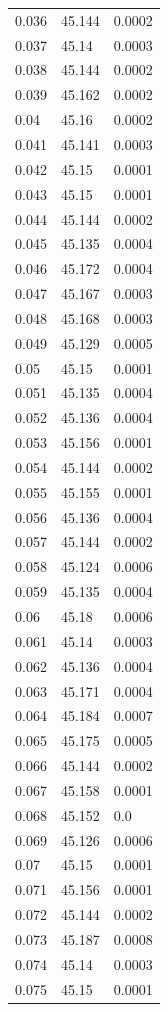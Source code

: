 \begin{table}[H]
\begin{tabular}{lll}
0.036 & 45.144 & 0.0002 \\
0.037 & 45.14 & 0.0003 \\
0.038 & 45.144 & 0.0002 \\
0.039 & 45.162 & 0.0002 \\
0.04 & 45.16 & 0.0002 \\
0.041 & 45.141 & 0.0003 \\
0.042 & 45.15 & 0.0001 \\
0.043 & 45.15 & 0.0001 \\
0.044 & 45.144 & 0.0002 \\
0.045 & 45.135 & 0.0004 \\
0.046 & 45.172 & 0.0004 \\
0.047 & 45.167 & 0.0003 \\
0.048 & 45.168 & 0.0003 \\
0.049 & 45.129 & 0.0005 \\
0.05 & 45.15 & 0.0001 \\
0.051 & 45.135 & 0.0004 \\
0.052 & 45.136 & 0.0004 \\
0.053 & 45.156 & 0.0001 \\
0.054 & 45.144 & 0.0002 \\
0.055 & 45.155 & 0.0001 \\
0.056 & 45.136 & 0.0004 \\
0.057 & 45.144 & 0.0002 \\
0.058 & 45.124 & 0.0006 \\
0.059 & 45.135 & 0.0004 \\
0.06 & 45.18 & 0.0006 \\
0.061 & 45.14 & 0.0003 \\
0.062 & 45.136 & 0.0004 \\
0.063 & 45.171 & 0.0004 \\
0.064 & 45.184 & 0.0007 \\
0.065 & 45.175 & 0.0005 \\
0.066 & 45.144 & 0.0002 \\
0.067 & 45.158 & 0.0001 \\
0.068 & 45.152 & 0.0 \\
0.069 & 45.126 & 0.0006 \\
0.07 & 45.15 & 0.0001 \\
0.071 & 45.156 & 0.0001 \\
0.072 & 45.144 & 0.0002 \\
0.073 & 45.187 & 0.0008 \\
0.074 & 45.14 & 0.0003 \\
0.075 & 45.15 & 0.0001 \\

\end{tabular}
\end{table}
